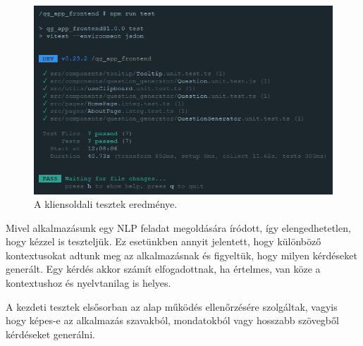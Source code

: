 \begin{figure}[h]
\centering
\includegraphics[scale=0.6]{images/test_frontend_3.png}
\caption{A kliensoldali tesztek eredménye.}
\label{fig:tf3}
\end{figure}


Mivel alkalmazásunk egy NLP feladat megoldására íródott, így elengedhetetlen, hogy kézzel is teszteljük. Ez esetünkben annyit jelentett, hogy különböző kontextusokat adtunk meg az alkalmazásnak és figyeltük, hogy milyen kérdéseket generált. Egy kérdés akkor számít elfogadottnak, ha értelmes, van köze a kontextushoz és nyelvtanilag is helyes.

A kezdeti tesztek elsősorban az alap működés ellenőrzésére szolgáltak, vagyis hogy képes-e az alkalmazás szavakból, mondatokból vagy hosszabb szövegből kérdéseket generálni.

